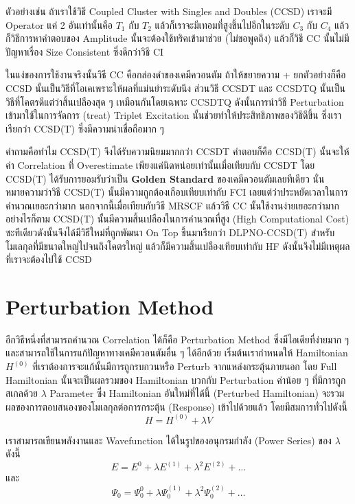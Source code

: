 ตัวอย่างเช่น ถ้าเราใช้วิธี Coupled Cluster with Singles and Doubles (CCSD) เราจะมี Operator แค่ 2 อันเท่านั้นคือ $T_{1}$ กับ $T_{2}$ แล้วก็เราจะมีเทอมที่สูงขึ้นไปอีกในระดับ $C_{3}$ กับ $C_{4}$ แล้วก็วิธีการหาคำตอบของ Amplitude นั้นจะต้องใช้ทริคเข้ามาช่วย (ไม่ขอพูดถึง) แล้วก็วิธี CC นั้นไม่มีปัญหาเรื่อง Size Consistent ซึ่งดีกว่าวิธี CI

ในแง่ของการใช้งานจริงนั้นวิธี CC คือกล่องดำของเคมีควอนตัม ถ้าให้ขยายความ + ยกตัวอย่างก็คือ CCSD นั้นเป็นวิธีที่โอเคเพราะให้ผลที่แม่นยำระดับนึง ส่วนวิธี CCSDT และ CCSDTQ นั้นเป็นวิธีที่โคตรดีแต่ว่าสิ้นเปลืองสุด ๆ เหมือนกันโดยเฉพาะ CCSDTQ ดังนั้นการนำวิธี Perturbation เข้ามาใช้ในการจัดการ (treat) Triplet Excitation นั้นช่วยทำให้ประสิทธิภาพของวิธีดีขึ้น ซึ่งเราเรียกว่า CCSD(T) ซึ่งมีความน่าเชื่อถือมาก ๆ

คำถามคือทำไม CCSD(T) จึงได้รับความนิยมมากกว่า CCSDT คำตอบก็คือ CCSD(T) นั้นจะให้ค่า Correlation ที่ Overestimate เพียงแค่นิดหน่อยเท่านั้นเมื่อเทียบกับ CCSDT โดย CCSD(T) ได้รับการยอมรับว่าเป็น \textbf{Golden Standard} ของเคมีควอนตัมเลยทีเดียว นั่นหมายความว่าวิธี CCSD(T) นั้นมีความถูกต้องเกือบเทียบเท่ากับ FCI เลยแต่ว่าประหยัดเวลาในการคำนวณเยอะกว่ามาก นอกจากนี้เมื่อเทียบกับวิธี MRSCF แล้ววิธี CC นั้นใช้งานง่ายเยอะกว่ามาก อย่างไรก็ตาม CCSD(T) นั้นมีความสิ้นเปลืองในการคำนวณที่สูง (High Computational Cost) ซะทีเดียวดังนั้นจึงได้มีวิธีใหม่ที่ถูกพัฒนา On Top ขึ้นมาเรียกว่า DLPNO-CCSD(T) สำหรับโมเลกุลที่มีขนาดใหญ่ไปจนถึงโคตรใหญ่ แล้วก็มีความสิ้นเปลืองเทียบเท่ากับ HF ดังนั้นจึงไม่มีเหตุผลที่เราจะต้องไปใช้ CCSD

\section{Perturbation Method}

อีกวิธีหนึ่งที่สามารถคำนวณ Correlation ได้ก็คือ Perturbation Method ซึ่งมีไอเดียที่ง่ายมาก ๆ และสามารถใช้ในการแก้ปัญหาทางเคมีควอนตัมอื่น ๆ ได้อีกด้วย เริ่มต้นเรากำหนดให้ Hamiltonian $H^{(0)}$ ที่เราต้องการจะแก้นั้นมีการถูกรบกวนหรือ Perturb จากแหล่งกระตุ้นภายนอก โดย Full Hamiltonian นั้นจะเป็นผลรวมของ Hamiltonian บวกกับ Perturbation ค่าน้อย ๆ ที่มีการถูกสเกลด้วย $\lambda$ Parameter ซึ่ง Hamiltonian อันใหม่ที่ได้นี้ (Perturbed Hamiltonian) จะรวมผลของการตอบสนองของโมเลกุลต่อการกระตุ้น (Response) เข้าไปด้วยแล้ว โดยมีสมการทั่วไปดังนี้
%
\begin{equation}
    H = H^{(0)} + \lambda V
\end{equation}

เราสามารถเขียนพลังงานและ Wavefunction ได้ในรูปของอนุกรมกำลัง (Power Series) ของ $\lambda$ ดังนี้
%
\begin{equation}
    E = E^{0} + \lambda E^{(1)} + \lambda^{2} E^{(2)} + \dots
\end{equation}
%
\noindent และ
%
\begin{equation}
    \Psi_{0} = \Psi_{0}^{0} + \lambda \Psi_{0}^{(1)}
    + \lambda^{2} \Psi_{0}^{(2)} + \dots
\end{equation}

